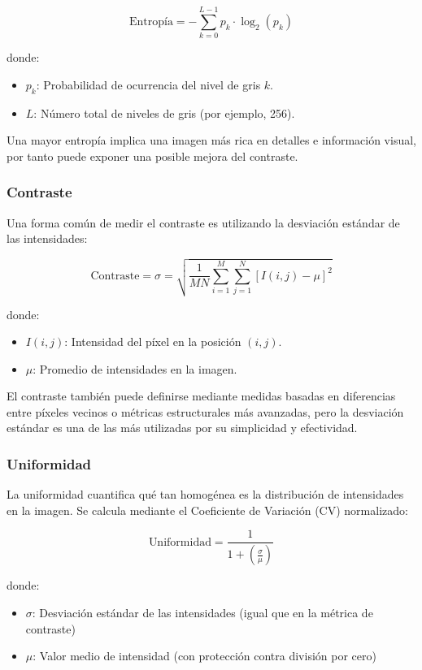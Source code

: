 \documentclass[sigchi]{acmart}
\begin{document}
\begin{equation}
	\text{Entropía} = - \sum_{k=0}^{L-1} p_k \cdot \log_2(p_k)
\end{equation}

donde:
\begin{itemize}
	\item $p_k$: Probabilidad de ocurrencia del nivel de gris $k$.
	\item $L$: Número total de niveles de gris (por ejemplo, 256).
\end{itemize}

Una mayor entropía implica una imagen más rica en detalles e información visual, por tanto
puede exponer una posible mejora del contraste.

\subsubsection{Contraste}
Una forma común de medir el contraste es utilizando la desviación estándar de las intensidades:

\begin{equation}
	\text{Contraste} = \sigma = \sqrt{\frac{1}{MN} \sum_{i=1}^{M} \sum_{j=1}^{N} \left[ I(i,j) - \mu \right]^2}
\end{equation}

donde:
\begin{itemize}
	\item $I(i,j)$: Intensidad del píxel en la posición $(i,j)$.
	\item $\mu$: Promedio de intensidades en la imagen.
\end{itemize}

El contraste también puede definirse mediante medidas basadas en diferencias entre píxeles
vecinos o métricas estructurales más avanzadas, pero la desviación estándar es una de las más
utilizadas por su simplicidad y efectividad.

\subsubsection{Uniformidad}
La uniformidad cuantifica qué tan homogénea es la distribución de intensidades en la imagen. Se
calcula mediante el Coeficiente de Variación (CV) normalizado:

\begin{equation}
	\text{Uniformidad} = \frac{1}{1 + \left(\frac{\sigma}{\mu}\right)}
\end{equation}

donde:
\begin{itemize}
	\item $\sigma$: Desviación estándar de las intensidades (igual que en la métrica de contraste)
	\item $\mu$: Valor medio de intensidad (con protección contra división por cero)
\end{itemize}
\end{document}
